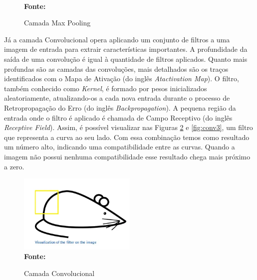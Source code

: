 \begin{figure}[ht]
    \centering
    \caption[Grade Computacional.]{Camada Max Pooling}
    \vspace{-0.2cm}
    \captionsetup{justification=centering}
    \vspace{-0.2cm}
    \\\textbf{\footnotesize Fonte: \cite{cnns}}
    \label{fig:maxpooling}
\end{figure}


Já a camada Convolucional opera aplicando um conjunto de filtros a uma imagem de entrada para extrair características importantes. A profundidade da saída de uma convolução é igual à quantidade de filtros aplicados. Quanto mais profundas são as camadas das convoluções, mais detalhados são os traços identificados com o Mapa de Ativação (do inglês \textit{Atactivation Map}). O filtro, também conhecido como \textit{Kernel}, é formado por pesos inicializados aleatoriamente, atualizando-os a cada nova entrada durante o processo de Retropropagação do Erro (do inglês \textit{Backpropagation}). A pequena região da entrada onde o filtro é aplicado é chamada de Campo Receptivo (do inglês \textit{Receptive Field}). Assim, é possível visualizar nas Figuras \ref{fig:conv2} e \ref{fig:conv3}, um filtro que representa a curva ao seu lado. Com essa combinação temos como resultado um número alto, indicando uma compatibilidade entre as curvas. Quando a imagem não possui nenhuma compatibilidade esse resultado chega mais próximo a zero.

\begin{figure}[ht]
 	\centering	
 	\caption[\hspace{0.1cm}Grade Computacional.]{Camada Convolucional}
 	\vspace{-0.4cm}
 	\includegraphics[width=0.5\textwidth]{figuras/conv2.png}
 	\captionsetup{justification=centering}
	\vspace{-0.2cm}
     \\\textbf{\footnotesize Fonte: \cite{cnns}}
	\label{fig:conv2}
\end{figure}

